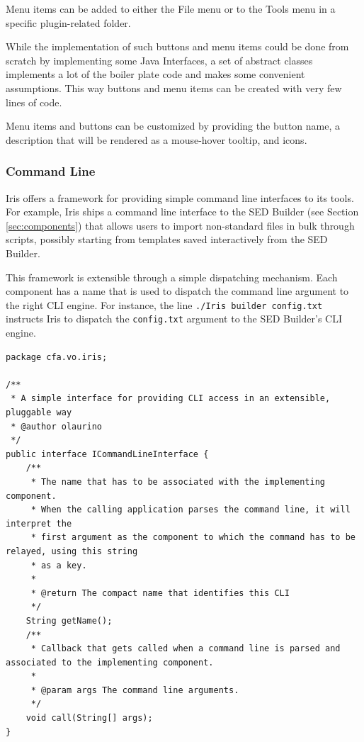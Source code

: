 \documentclass[5p]{elsarticle}
\begin{document}
Menu items can be added to either the File menu or to the Tools menu in a specific plugin-related folder.

While the implementation of such buttons and menu items could be done from scratch by implementing some Java Interfaces, a set of abstract classes implements a lot of the boiler plate code and makes some convenient assumptions. This way buttons and menu items can be created with very few lines of code.

Menu items and buttons can be customized by providing the button name, a description that will be rendered as a mouse-hover tooltip, and icons.

\subsubsection{Command Line}
Iris offers a framework for providing simple command line interfaces to its tools. For example, Iris ships a command line interface to the SED Builder (see Section \ref{sec:components}) that allows users to import non-standard files in bulk through scripts, possibly starting from templates saved interactively from the SED Builder.

This framework is extensible through a simple dispatching mechanism. Each component has a name that is used to dispatch the command line argument to the right CLI engine. For instance, the line \verb|./Iris builder config.txt| instructs Iris to dispatch the \verb|config.txt| argument to the SED Builder's CLI engine.


\begin{lstlisting}[style=java,
	caption={Every Iris component can expose a command line interface. Iris dispatches the command line arguments for the relative component to process.},
	label=lst:cli]
package cfa.vo.iris;

/**
 * A simple interface for providing CLI access in an extensible, pluggable way
 * @author olaurino
 */
public interface ICommandLineInterface {
    /**
     * The name that has to be associated with the implementing component.
     * When the calling application parses the command line, it will interpret the
     * first argument as the component to which the command has to be relayed, using this string
     * as a key.
     *
     * @return The compact name that identifies this CLI
     */
    String getName();
    /**
     * Callback that gets called when a command line is parsed and associated to the implementing component.
     *
     * @param args The command line arguments.
     */
    void call(String[] args);
}
\end{lstlisting}
\end{document}
